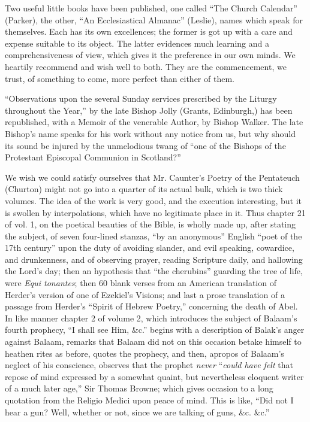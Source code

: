 Two useful little books have been published, one
called ``The Church Calendar'' (Parker), the other, ``An
Ecclesiastical Almanac'' (Leslie), names which speak for themselves. Each
has its own excellences; the former is got up with a care and expense
suitable to its object. The latter evidences much learning and a
comprehensiveness of view, which gives it the preference in our own
minds. We heartily recommend and wish well to both. They are the
commencement, we trust, of something to come, more perfect than either
of them.

``Observations upon the several Sunday services
prescribed by the Liturgy throughout the Year,'' by the late Bishop Jolly
(Grants, Edinburgh,) has been republished, with a Memoir of the
venerable Author, by Bishop Walker. The late Bishop's name speaks for
his work without any notice from us, but why should its sound be injured
by the unmelodious twang of ``one of the Bishops of the Protestant
Episcopal Communion in Scotland?''

We wish we could satisfy ourselves that Mr. Caunter's
Poetry of the Pentateuch (Churton) might not go into a quarter of its
actual bulk, which is two thick volumes. The idea of the work is very
good, and the execution interesting, but it is swollen by
interpolations, which have no legitimate place in it. Thus chapter 21 of
vol. 1, on the poetical beauties of the Bible, is wholly made up, after
stating the subject, of seven four-lined stanzas, ``by an anonymous''
English ``poet of the 17th century'' upon the duty of avoiding slander,
and evil speaking, cowardice, and drunkenness, and of observing prayer,
reading Scripture daily, and hallowing the Lord's day; then an
hypothesis that ``the cherubins'' guarding the tree of life, were \emph{Equi
tonantes}; then 60 blank verses from an American translation of
Herder's version of one of Ezekiel's Visions; and last a prose
translation of a passage from Herder's ``Spirit of Hebrew Poetry,''
concerning the death of Abel. In like manner chapter 2 of volume 2,
which introduces the subject of Balaam's fourth prophecy, ``I shall see
Him, \&c.'' begins with a description of Balak's anger against Balaam,
remarks that Balaam did not on this occasion betake himself to heathen
rites as before, quotes the prophecy, and then, apropos of Balaam's
neglect of his conscience, observes that the prophet \emph{never} ``\emph{could
have felt} that repose of mind expressed by a somewhat quaint, but
nevertheless eloquent writer of a much later age,'' Sir Thomas Browne;
which gives occasion to a long quotation from the Religio Medici upon
peace of mind. This is like, ``Did not I hear a gun? Well, whether or
not, since we are talking of guns, \&c. \&c.''

